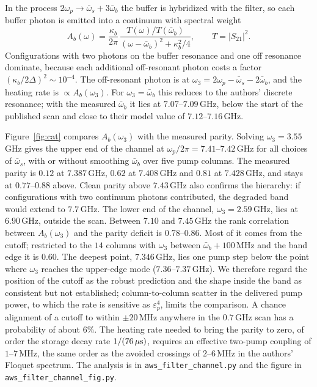 \documentclass[aps,prresearch,twocolumn,superscriptaddress,nofootinbib,longbibliography,floatfix]{revtex4-2}
\begin{document}
In the process $2\omega_p\to\bar\omega_s+3\bar\omega_b$ the buffer is hybridized with the filter, so each buffer photon is
emitted into a continuum with spectral weight
\begin{equation}
A_b(\omega)=\frac{\kappa_b}{2\pi}\,\frac{T(\omega)/T(\bar\omega_b)}{(\omega-\bar\omega_b)^2+\kappa_b^2/4},\qquad
T=|S_{21}|^2 .
\end{equation}
Configurations with two photons on the buffer resonance and one off resonance dominate, because each additional
off-resonant photon costs a factor $(\kappa_b/2\Delta)^2\sim10^{-4}$. The off-resonant photon is at
$\omega_3=2\omega_p-\bar\omega_s-2\bar\omega_b$, and the heating rate is $\propto A_b(\omega_3)$. For
$\omega_3=\bar\omega_b$ this reduces to the authors' discrete resonance; with the measured $\bar\omega_b$ it lies at
$7.07$--$7.09$\,GHz, below the start of the published scan and close to their model value of $7.12$--$7.16$\,GHz.

Figure~\ref{fig:cat} compares $A_b(\omega_3)$ with the measured parity. Solving $\omega_3=3.55$\,GHz gives the upper end of
the channel at $\omega_p/2\pi=7.41$--$7.42$\,GHz for all choices of $\bar\omega_s$, with or without smoothing
$\bar\omega_b$ over five pump columns. The measured parity is $0.12$ at $7.387$\,GHz, $0.62$ at $7.408$\,GHz and $0.81$
at $7.428$\,GHz, and stays at $0.77$--$0.88$ above. Clean parity above $7.43$\,GHz also confirms the hierarchy: if
configurations with two continuum photons contributed, the degraded band would extend to $7.7$\,GHz. The lower end of
the channel, $\omega_3=2.59$\,GHz, lies at $6.90$\,GHz, outside the scan. Between $7.10$ and $7.45$\,GHz the rank
correlation between $A_b(\omega_3)$ and the parity deficit is $0.78$--$0.86$. Most of it comes from the cutoff; restricted
to the $14$ columns with $\omega_3$ between $\bar\omega_b+100$\,MHz and the band edge it is $0.60$. The deepest point,
$7.346$\,GHz, lies one pump step below the point where $\omega_3$ reaches the upper-edge mode ($7.36$--$7.37$\,GHz). We
therefore regard the position of the cutoff as the robust prediction and the shape inside the band as consistent but
not established; column-to-column scatter in the delivered pump power, to which the rate is sensitive as
$\varepsilon_p^4$, limits the comparison. A chance alignment of a cutoff to within $\pm20$\,MHz anywhere in the
$0.7$\,GHz scan has a probability of about $6\%$. The heating rate needed to bring the parity to zero, of order the
storage decay rate $1/(76\,\mu{\rm s})$, requires an effective two-pump coupling of $1$--$7$\,MHz, the same order as
the avoided crossings of $2$--$6$\,MHz in the authors' Floquet spectrum. The analysis is in
\texttt{aws\_filter\_channel.py} and the figure in \texttt{aws\_filter\_channel\_fig.py}.
\end{document}
